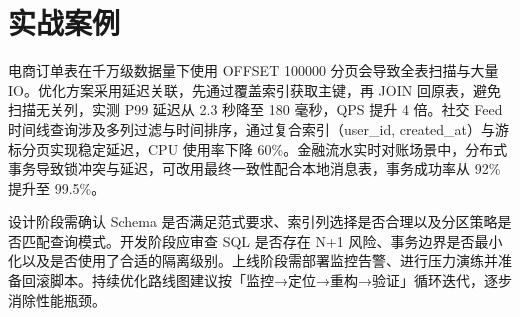 \chapter{实战案例}
电商订单表在千万级数据量下使用 OFFSET 100000 分页会导致全表扫描与大量 IO。优化方案采用延迟关联，先通过覆盖索引获取主键，再 JOIN 回原表，避免扫描无关列，实测 P99 延迟从 2.3 秒降至 180 毫秒，QPS 提升 4 倍。社交 Feed 时间线查询涉及多列过滤与时间排序，通过复合索引（user\_{}id, created\_{}at）与游标分页实现稳定延迟，CPU 使用率下降 60\%{}。金融流水实时对账场景中，分布式事务导致锁冲突与延迟，可改用最终一致性配合本地消息表，事务成功率从 92\%{} 提升至 99.5\%{}。\par
设计阶段需确认 Schema 是否满足范式要求、索引列选择是否合理以及分区策略是否匹配查询模式。开发阶段应审查 SQL 是否存在 N+1 风险、事务边界是否最小化以及是否使用了合适的隔离级别。上线阶段需部署监控告警、进行压力演练并准备回滚脚本。持续优化路线图建议按「监控→定位→重构→验证」循环迭代，逐步消除性能瓶颈。\par

